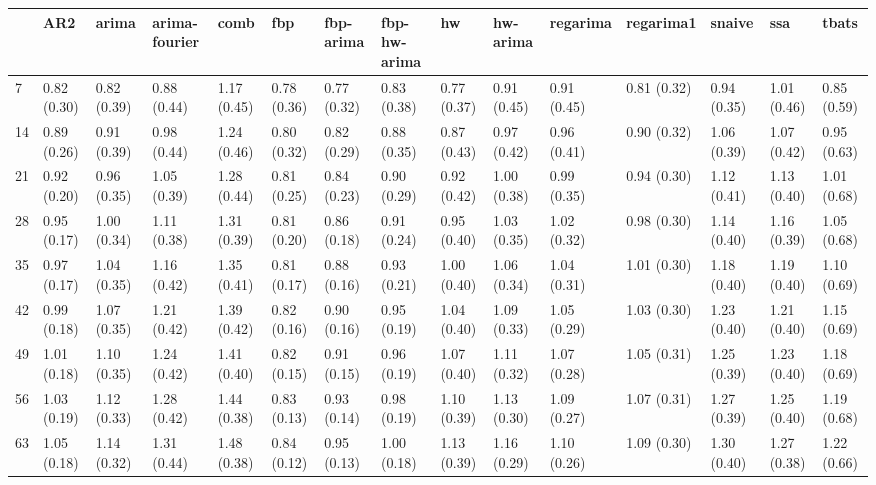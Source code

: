 \begin{tabular}{lllllllllllllll}
\toprule
{} &          AR2 &        arima & arima-fourier &         comb &          fbp &    fbp-arima & fbp-hw-arima &           hw &     hw-arima &     regarima &    regarima1 &       snaive &          ssa &        tbats \\
\midrule
7   &  0.82 (0.30) &  0.82 (0.39) &   0.88 (0.44) &  1.17 (0.45) &  0.78 (0.36) &  0.77 (0.32) &  0.83 (0.38) &  0.77 (0.37) &  0.91 (0.45) &  0.91 (0.45) &  0.81 (0.32) &  0.94 (0.35) &  1.01 (0.46) &  0.85 (0.59) \\
14  &  0.89 (0.26) &  0.91 (0.39) &   0.98 (0.44) &  1.24 (0.46) &  0.80 (0.32) &  0.82 (0.29) &  0.88 (0.35) &  0.87 (0.43) &  0.97 (0.42) &  0.96 (0.41) &  0.90 (0.32) &  1.06 (0.39) &  1.07 (0.42) &  0.95 (0.63) \\
21  &  0.92 (0.20) &  0.96 (0.35) &   1.05 (0.39) &  1.28 (0.44) &  0.81 (0.25) &  0.84 (0.23) &  0.90 (0.29) &  0.92 (0.42) &  1.00 (0.38) &  0.99 (0.35) &  0.94 (0.30) &  1.12 (0.41) &  1.13 (0.40) &  1.01 (0.68) \\
28  &  0.95 (0.17) &  1.00 (0.34) &   1.11 (0.38) &  1.31 (0.39) &  0.81 (0.20) &  0.86 (0.18) &  0.91 (0.24) &  0.95 (0.40) &  1.03 (0.35) &  1.02 (0.32) &  0.98 (0.30) &  1.14 (0.40) &  1.16 (0.39) &  1.05 (0.68) \\
35  &  0.97 (0.17) &  1.04 (0.35) &   1.16 (0.42) &  1.35 (0.41) &  0.81 (0.17) &  0.88 (0.16) &  0.93 (0.21) &  1.00 (0.40) &  1.06 (0.34) &  1.04 (0.31) &  1.01 (0.30) &  1.18 (0.40) &  1.19 (0.40) &  1.10 (0.69) \\
42  &  0.99 (0.18) &  1.07 (0.35) &   1.21 (0.42) &  1.39 (0.42) &  0.82 (0.16) &  0.90 (0.16) &  0.95 (0.19) &  1.04 (0.40) &  1.09 (0.33) &  1.05 (0.29) &  1.03 (0.30) &  1.23 (0.40) &  1.21 (0.40) &  1.15 (0.69) \\
49  &  1.01 (0.18) &  1.10 (0.35) &   1.24 (0.42) &  1.41 (0.40) &  0.82 (0.15) &  0.91 (0.15) &  0.96 (0.19) &  1.07 (0.40) &  1.11 (0.32) &  1.07 (0.28) &  1.05 (0.31) &  1.25 (0.39) &  1.23 (0.40) &  1.18 (0.69) \\
56  &  1.03 (0.19) &  1.12 (0.33) &   1.28 (0.42) &  1.44 (0.38) &  0.83 (0.13) &  0.93 (0.14) &  0.98 (0.19) &  1.10 (0.39) &  1.13 (0.30) &  1.09 (0.27) &  1.07 (0.31) &  1.27 (0.39) &  1.25 (0.40) &  1.19 (0.68) \\
63  &  1.05 (0.18) &  1.14 (0.32) &   1.31 (0.44) &  1.48 (0.38) &  0.84 (0.12) &  0.95 (0.13) &  1.00 (0.18) &  1.13 (0.39) &  1.16 (0.29) &  1.10 (0.26) &  1.09 (0.30) &  1.30 (0.40) &  1.27 (0.38) &  1.22 (0.66) \\

\end{tabular}
